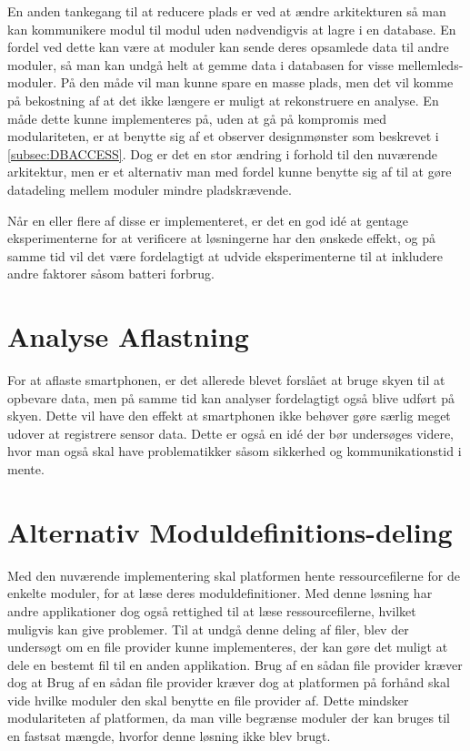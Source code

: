En anden tankegang til at reducere plads er ved at ændre arkitekturen så man kan kommunikere modul til modul uden nødvendigvis at lagre i en database.
En fordel ved dette kan være at moduler kan sende deres opsamlede data til andre moduler, så man kan undgå helt at gemme data i databasen for visse mellemleds-moduler.
På den måde vil man kunne spare en masse plads, men det vil komme på bekostning af at det ikke længere er muligt at rekonstruere en analyse. En måde dette kunne implementeres på, uden at gå på kompromis med modulariteten, er at benytte sig af et observer designmønster som beskrevet i \cref{subsec:DBACCESS}.
Dog er det en stor ændring i forhold til den nuværende arkitektur, men er et alternativ man med fordel kunne benytte sig af til at gøre datadeling mellem moduler mindre pladskrævende.

Når en eller flere af disse er implementeret, er det en god idé at gentage eksperimenterne for at verificere at løsningerne har den ønskede effekt, og på samme tid vil det være fordelagtigt at udvide eksperimenterne til at inkludere andre faktorer såsom batteri forbrug.

\section{Analyse Aflastning}
For at aflaste smartphonen, er det allerede blevet forslået at bruge skyen til at opbevare data, men på samme tid kan analyser fordelagtigt også blive udført på skyen. 
Dette vil have den effekt at smartphonen ikke behøver gøre særlig meget udover at registrere sensor data.
Dette er også en idé der bør undersøges videre, hvor man også skal have problematikker såsom sikkerhed og kommunikationstid i mente.

\section{Alternativ Moduldefinitions-deling}
Med den nuværende implementering skal platformen hente ressourcefilerne for de enkelte moduler, for at læse deres moduldefinitioner.
Med denne løsning har andre applikationer dog også rettighed til at læse ressourcefilerne, hvilket muligvis kan give problemer.
Til at undgå denne deling af filer, blev der undersøgt om en file provider kunne implementeres, der kan gøre det muligt at dele en bestemt fil til en anden applikation.
Brug af en sådan file provider kræver dog at 
Brug af en sådan file provider kræver dog at platformen på forhånd skal vide hvilke moduler den skal benytte en file provider af.
Dette mindsker modulariteten af platformen, da man ville begrænse moduler der kan bruges til en fastsat mængde, hvorfor denne løsning ikke blev brugt.

